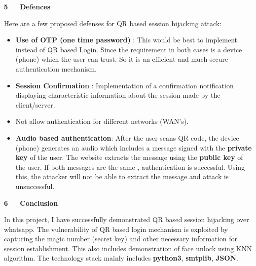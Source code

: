 \documentclass[12pt]{article}
\renewcommand{\_}{\kern-1.5pt\textunderscore\kern-1.5pt}
\begin{document}
\vspace{\baselineskip}
\begin{FlushLeft}
{\fontsize{18pt}{21.6pt}\selectfont \textbf{5\ \ \  Defences}\par}
\end{FlushLeft}\par

\begin{FlushLeft}
Here are a few proposed defenses for QR based session hijacking attack:
\end{FlushLeft}\par

\begin{itemize}
	\item \textbf{Use of OTP (one time password)} : This would be best to implement instead of QR based Login. Since the requirement in both cases is a device (phone) which the user can trust. So it is an efficient and much secure authentication mechanism.\par

	\item \textbf{Session Confirmation} : Implementation of a confirmation notification displaying characteristic information about the session made by the client/server.\par

	\item Not allow authentication for different networks (WAN’s).\par

	\item \textbf{Audio based authentication}: After the user scans QR code, the device (phone) generates an audio which includes a message signed with the \textbf{private key} of the user. The website extracts the message using the \textbf{public key} of the user. If both messages are the same , authentication is successful. Using this, the attacker will not be able to extract the message and attack is unsuccessful.
\end{itemize}\par

\begin{FlushLeft}
{\fontsize{18pt}{21.6pt}\selectfont \textbf{6\ \ \  Conclusion}\par}
\end{FlushLeft}\par

\begin{FlushLeft}
In this project, I have successfully demonstrated QR based session hijacking over whatsapp. The vulnerability of QR based login mechanism is exploited by capturing the magic number (secret key) and other necessary information for session establishment. This also includes demonstration of face unlock using KNN algorithm. The technology stack mainly includes \textbf{python3}, \textbf{smtplib}, \textbf{JSON}.
\end{FlushLeft}\par
\end{document}
